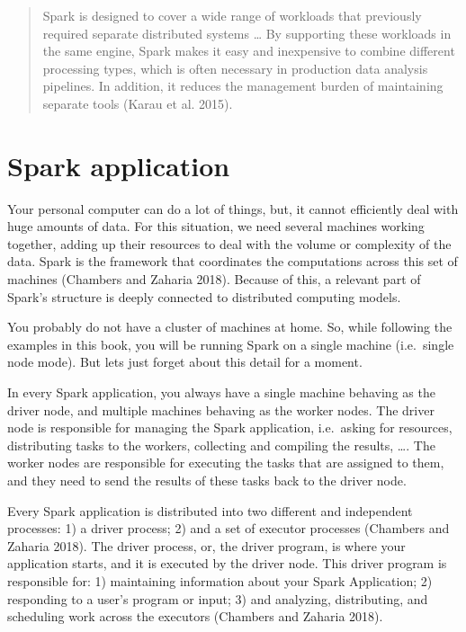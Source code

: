 \documentclass[
  11pt,
  letterpaper,
  DIV=11,
  numbers=noendperiod]{scrreprt}
\begin{document}
\begin{quote}
Spark is designed to cover a wide range of workloads that previously
required separate distributed systems \ldots{} By supporting these
workloads in the same engine, Spark makes it easy and inexpensive to
combine different processing types, which is often necessary in
production data analysis pipelines. In addition, it reduces the
management burden of maintaining separate tools (Karau et al. 2015).
\end{quote}

\hypertarget{spark-application}{%
\section{Spark application}\label{spark-application}}

Your personal computer can do a lot of things, but, it cannot
efficiently deal with huge amounts of data. For this situation, we need
several machines working together, adding up their resources to deal
with the volume or complexity of the data. Spark is the framework that
coordinates the computations across this set of machines (Chambers and
Zaharia 2018). Because of this, a relevant part of Spark's structure is
deeply connected to distributed computing models.

You probably do not have a cluster of machines at home. So, while
following the examples in this book, you will be running Spark on a
single machine (i.e.~single node mode). But lets just forget about this
detail for a moment.

In every Spark application, you always have a single machine behaving as
the driver node, and multiple machines behaving as the worker nodes. The
driver node is responsible for managing the Spark application,
i.e.~asking for resources, distributing tasks to the workers, collecting
and compiling the results, \ldots. The worker nodes are responsible for
executing the tasks that are assigned to them, and they need to send the
results of these tasks back to the driver node.

Every Spark application is distributed into two different and
independent processes: 1) a driver process; 2) and a set of executor
processes (Chambers and Zaharia 2018). The driver process, or, the
driver program, is where your application starts, and it is executed by
the driver node. This driver program is responsible for: 1) maintaining
information about your Spark Application; 2) responding to a user's
program or input; 3) and analyzing, distributing, and scheduling work
across the executors (Chambers and Zaharia 2018).
\end{document}
